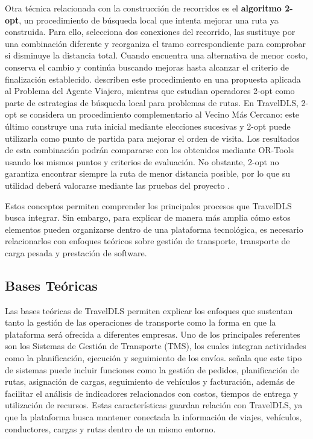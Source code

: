 Otra técnica relacionada con la construcción de recorridos es el \hypertarget{concepto-dos-opt}{\textbf{algoritmo 2-opt}}, un procedimiento de búsqueda local que intenta mejorar una ruta ya construida. Para ello, selecciona dos conexiones del recorrido, las sustituye por una combinación diferente y reorganiza el tramo correspondiente para comprobar si disminuye la distancia total. Cuando encuentra una alternativa de menor costo, conserva el cambio y continúa buscando mejoras hasta alcanzar el criterio de finalización establecido. \textcite{uddin2023twoopt} describen este procedimiento en una propuesta aplicada al Problema del Agente Viajero, mientras que \textcite{dacosta2021twoopt} estudian operadores 2-opt como parte de estrategias de búsqueda local para problemas de rutas. En TravelDLS, 2-opt se considera un procedimiento complementario al Vecino Más Cercano: este último construye una ruta inicial mediante elecciones sucesivas y 2-opt puede utilizarla como punto de partida para mejorar el orden de visita. Los resultados de esta combinación podrán compararse con los obtenidos mediante OR-Tools usando los mismos puntos y criterios de evaluación. No obstante, 2-opt no garantiza encontrar siempre la ruta de menor distancia posible, por lo que su utilidad deberá valorarse mediante las pruebas del proyecto \parencite{dacosta2021twoopt,uddin2023twoopt}.

Estos conceptos permiten comprender los principales procesos que TravelDLS busca integrar. Sin embargo, para explicar de manera más amplia cómo estos elementos pueden organizarse dentro de una plataforma tecnológica, es necesario relacionarlos con enfoques teóricos sobre gestión de transporte, transporte de carga pesada y prestación de software.

\subsection{Bases Teóricas}

Las bases teóricas de TravelDLS permiten explicar los enfoques que sustentan tanto la gestión de las operaciones de transporte como la forma en que la plataforma será ofrecida a diferentes empresas. Uno de los principales referentes son los \hypertarget{concepto-tms}{}Sistemas de Gestión de Transporte (TMS), los cuales integran actividades como la planificación, ejecución y seguimiento de los envíos. \textcite[pp.~10--11]{sepulveda2023propuesta} señala que este tipo de sistemas puede incluir funciones como la gestión de pedidos, planificación de rutas, asignación de cargas, seguimiento de vehículos y facturación, además de facilitar el análisis de indicadores relacionados con costos, tiempos de entrega y utilización de recursos. Estas características guardan relación con TravelDLS, ya que la plataforma busca mantener conectada la información de viajes, vehículos, conductores, cargas y rutas dentro de un mismo entorno.

